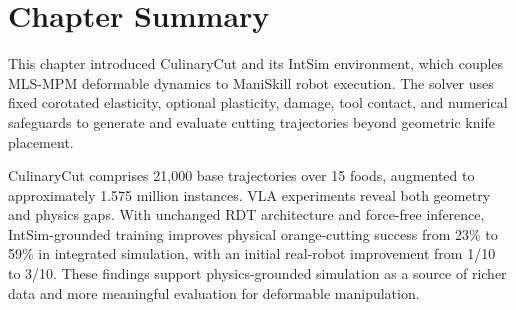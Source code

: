 \FloatBarrier

\section{Chapter Summary}
\label{sec:cut_summary}

This chapter introduced CulinaryCut and its IntSim environment, which couples MLS-MPM deformable dynamics to ManiSkill robot execution. The solver uses fixed corotated elasticity, optional plasticity, damage, tool contact, and numerical safeguards to generate and evaluate cutting trajectories beyond geometric knife placement.

CulinaryCut comprises 21,000 base trajectories over 15 foods, augmented to approximately 1.575 million instances. VLA experiments reveal both geometry and physics gaps. With unchanged RDT architecture and force-free inference, IntSim-grounded training improves physical orange-cutting success from 23\% to 59\% in integrated simulation, with an initial real-robot improvement from 1/10 to 3/10. These findings support physics-grounded simulation as a source of richer data and more meaningful evaluation for deformable manipulation.

\FloatBarrier
